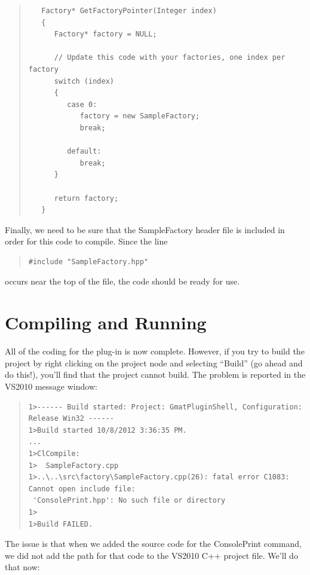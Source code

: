 \documentclass[10pt,letterpaper]{article}
\begin{document}
\begin{quote}
\begin{verbatim}
   Factory* GetFactoryPointer(Integer index)
   {
      Factory* factory = NULL;

	  // Update this code with your factories, one index per factory
      switch (index)
      {
         case 0:
            factory = new SampleFactory;
            break;
            
         default:
            break;
      }

      return factory;
   }
\end{verbatim}
\end{quote}

Finally, we need to be sure that the SampleFactory header file is included in order for this code to compile.  Since the line

\begin{quote}
\begin{verbatim}
#include "SampleFactory.hpp"
\end{verbatim}
\end{quote}

\noindent occurs near the top of the file, the code should be ready for use.

\section{Compiling and Running}

All of the coding for the plug-in is now complete.  However, if you try to build the project by right clicking on the project node and selecting ``Build'' (go ahead and do this!), you'll find that the project cannot build.  The problem is reported in the VS2010 message window:

\begin{quote}
\begin{verbatim}
1>------ Build started: Project: GmatPluginShell, Configuration: Release Win32 ------
1>Build started 10/8/2012 3:36:35 PM.
...
1>ClCompile:
1>  SampleFactory.cpp
1>..\..\src\factory\SampleFactory.cpp(26): fatal error C1083: Cannot open include file:
 'ConsolePrint.hpp': No such file or directory
1>
1>Build FAILED.
\end{verbatim}
\end{quote}

The issue is that when we added the source code for the ConsolePrint command, we did not add the path for that code to the VS2010 C++ project file.  We'll do that now:
\end{document}
